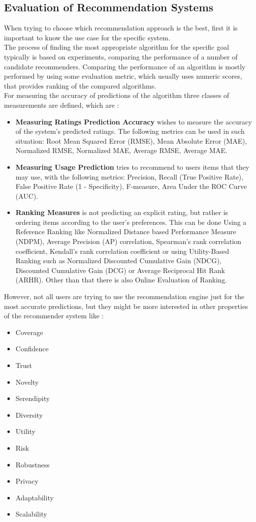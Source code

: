 \documentclass[\myFontSize,oneside,english,hidelinks,a4paper]{article}
\begin{document}
\subsection{Evaluation of Recommendation Systems}
When trying to choose which recommendation approach is the best, first it is important to know the use case for the specific system. \\
The process of finding the most appropriate algorithm for the specific goal typically is based on experiments, comparing the performance of a number of candidate recommenders. Comparing the performance of an algorithm is mostly performed by using some evaluation metric, which usually uses numeric scores, that provides ranking of the compared algorithms. \\
For measuring the accuracy of predictions of the algorithm three classes of measurements are defined, which are \cite{Gunawardana2022547}:
\begin{itemize}
\item \textbf{Measuring Ratings Prediction Accuracy} wishes to measure the accuracy of the system's predicted ratings. The following metrics can be used in such situation: Root Mean Squared Error (RMSE), Mean Absolute Error (MAE), Normalized RMSE, Normalized MAE, Average RMSE, Average MAE.
\item \textbf{Measuring Usage Prediction} tries to recommend to users items that they may use, with the following metrics: Precision, Recall (True Positive Rate), False Positive Rate (1 - Specificity), F-measure, Area Under the ROC Curve (AUC).
\item \textbf{Ranking Measures} is not predicting an explicit rating, but rather is ordering items according to the user's preferences. This can be done Using a Reference Ranking like Normalized Distance based Performance Measure (NDPM), Average Precision (AP) correlation, Spearman's rank correlation coefficient, Kendall's rank correlation coefficient or using Utility-Based Ranking such as Normalized Discounted Cumulative Gain (NDCG), Discounted Cumulative Gain (DCG) or Average Reciprocal Hit Rank (ARHR). Other than that there is also Online Evaluation of Ranking.
\end{itemize}
%
%
%
However, not all users are trying to use the recommendation engine just for the most accurate predictions, but they might be more interested in other properties of the recommender system like \cite{Gunawardana2022547}:
\begin{multicols}{3}
\begin{itemize}
\item Coverage
\item Confidence
\item Trust
\item Novelty
\item Serendipity
\item Diversity
\item Utility
\item Risk
\item Robustness
\item Privacy
\item Adaptability
\item Scalability
\end{itemize}
\end{multicols}
\end{document}
